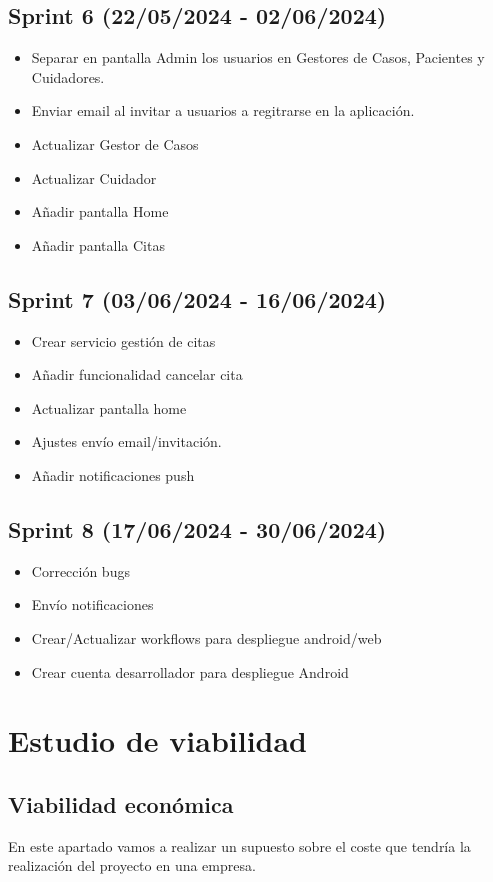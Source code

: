 \subsection{Sprint 6 (22/05/2024 - 02/06/2024)}
\begin{itemize}
\tightlist 
\item Separar en pantalla Admin los usuarios en Gestores de Casos, Pacientes y Cuidadores.
\item Enviar email al invitar a usuarios a regitrarse en la aplicación.
\item Actualizar Gestor de Casos
\item Actualizar Cuidador
\item Añadir pantalla Home
\item Añadir pantalla Citas
\end{itemize}

\subsection{Sprint 7 (03/06/2024 - 16/06/2024)}
\begin{itemize}
\tightlist 
\item Crear servicio gestión de citas
\item Añadir funcionalidad cancelar cita
\item Actualizar pantalla home
\item Ajustes envío email/invitación.
\item Añadir notificaciones push
\end{itemize}

\subsection{Sprint 8 (17/06/2024 - 30/06/2024)}
\begin{itemize}
\tightlist 
\item Corrección bugs
\item Envío notificaciones
\item Crear/Actualizar workflows para despliegue android/web
\item Crear cuenta desarrollador para despliegue Android
\end{itemize}

\section{Estudio de viabilidad}

\subsection{Viabilidad económica}
En este apartado vamos a realizar un supuesto sobre el coste que tendría la realización del proyecto en una empresa.

